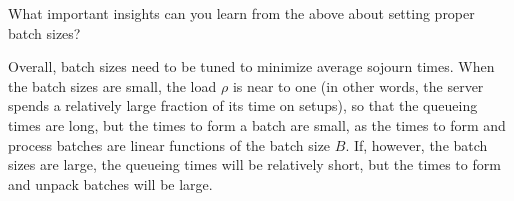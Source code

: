 \begin{exercise}
  What important insights can you learn from the above about setting proper batch sizes?
\begin{solution}
 Overall, batch sizes need to be tuned to minimize average sojourn times.
 When the batch sizes are small, the load $\rho$ is near to one (in other words, the server spends a relatively large fraction of its time on setups), so that the queueing times are long, but the times to form a batch are small, as the times to form and process batches are linear functions of the batch size $B$.
 If, however, the batch sizes are large, the queueing times will be relatively short, but the times to form and unpack batches will be large.
\end{solution}
\end{exercise}


